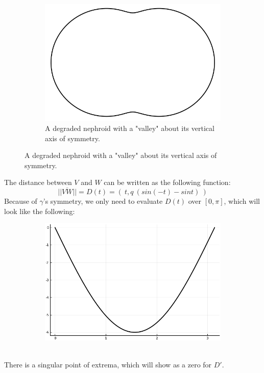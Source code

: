 \documentclass[12pt]{article}
\begin{document}
\begin{figure}[h!]
  \centering
      \begin{subfigure}[b]{0.5\linewidth}
    \includegraphics[width=\linewidth]{./assets/3-3-1/nephroid-degraded.png}
    \caption*{A degraded nephroid with a "valley" about its vertical axis of symmetry.}
  \end{subfigure}
  \end{figure}

\clearpage
The distance between $V$ and $W$ can be written as the following function:\\
$$
||\overline{VW}|| = D(t) = ( \ t, q \ (sin(-t) - sint) \ )
$$
Because of $\gamma$'s symmetry, we only need to evaluate $D(t)$ over $[0, \pi]$, which will look like the following:
\begin{figure}[h!]
  \centering
      \begin{subfigure}[b]{0.7\linewidth}
    \includegraphics[width=\linewidth]{./assets/3-3-1/ellipse-chord-distance.png}
  \end{subfigure}
  \end{figure}
  \\
There is a singular point of extrema, which will show as a zero for $D'$.
\end{document}
